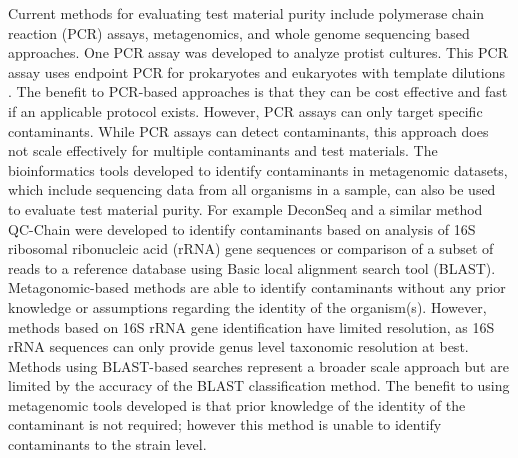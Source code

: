 \documentclass[fleqn,10pt,lineno]{wlpeerj}\usepackage[]{graphicx}\usepackage[]{color}
\begin{document}
Current methods for evaluating test material purity include polymerase chain reaction (PCR) assays, metagenomics, and whole genome sequencing based approaches. 
One PCR assay was developed to analyze protist cultures. 
This PCR assay uses endpoint PCR for prokaryotes and eukaryotes with template dilutions \citep{Marron2013}. 
The benefit to PCR-based approaches is that they can be cost effective and fast if an applicable protocol exists. 
However, PCR assays can only target specific contaminants.  While PCR assays can detect contaminants, this approach does not scale effectively for multiple contaminants and test materials. 
The bioinformatics tools developed to identify contaminants in metagenomic datasets, which include sequencing data from all organisms in a sample, can also be used to evaluate test material purity. 
For example DeconSeq \citep{Schmieder2011} and a similar method QC-Chain \citep{Zhou2013} were developed to identify contaminants based on analysis of 16S ribosomal ribonucleic acid (rRNA) gene sequences or comparison of a subset of reads to a reference database using Basic local alignment search tool (BLAST). 
Metagonomic-based methods are able to identify contaminants without any prior knowledge or assumptions regarding the identity of the organism(s). 
However, methods based on 16S rRNA gene identification have limited resolution, as 16S rRNA sequences can only provide genus level taxonomic resolution at best. 
Methods using BLAST-based searches represent a broader scale approach but are limited by the accuracy of the BLAST classification method. 
The benefit to using metagenomic tools developed is that prior knowledge of the identity of the contaminant is not required; however this method is unable to identify contaminants to the strain level.   
\end{document}

